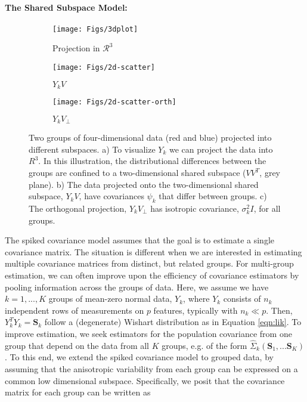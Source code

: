 \documentclass{article}
\newcommand{\bl}[1]{{\mathbf #1}}
\begin{document}
\paragraph{The Shared Subspace Model:}

\begin{figure}[t]
    \centering
    \begin{subfigure}[b]{0.25\textwidth}
        \texttt{[image: Figs/3dplot]}
        \caption{Projection in $\mathcal{R}^3$}
        \label{fig:dmelanRatio}
    \end{subfigure}
\quad
    \begin{subfigure}[b]{0.25\textwidth}
        \texttt{[image: Figs/2d-scatter]}
        \caption{$Y_kV$}
        \label{fig:dmelanPosterior}
    \end{subfigure}
\quad 
    \begin{subfigure}[b]{0.25\textwidth}
        \texttt{[image: Figs/2d-scatter-orth]}
        \caption{$Y_kV_{\perp}$}
        \label{fig:dmelanPosterior}
    \end{subfigure}
    \caption{ Two groups of four-dimensional data (red and blue)
      projected into different subspaces.  a) To visualize $Y_k$ we
      can project the data into $R^3$.  In this illustration, the
      distributional differences between the groups are confined to a
      two-dimensional shared subspace ($VV^T$, grey plane).  b) The
      data projected onto the two-dimensional shared subspace,
      $Y_kV$, have covariances $\psi_k$ that differ between
      groups. c) The orthogonal projection, $Y_kV_{\perp}$
      has isotropic covariance, $\sigma_k^2I$, for all groups.  }
\label{fig:shared}
\end{figure}

The spiked covariance model assumes that the goal is to estimate a
single covariance matrix.  The situation is different when we are
interested in estimating multiple covariance matrices from distinct,
but related groups.  For multi-group estimation, we can often improve
upon the efficiency of covariance estimators by pooling information
across the groups of data.  Here, we assume we have $k=1, ..., K$
groups of mean-zero normal data, $Y_k$, where $Y_k$ consists of $n_k$
independent rows of measurements on $p$ features, typically with
$n_k \ll p$.  Then, $Y_k^TY_k = \bl S_k$ follow a (degenerate) Wishart
distribution as in Equation \ref{eqn:lik}.  To improve estimation, we
seek estimators for the population covariance from one group that depend on the
data from all $K$ groups, e.g. of the form
$\hat \Sigma_k(\bl S_1, ... \bl S_K)$.  To this end, we extend the
spiked covariance model to grouped data, by assuming that the
anisotropic variability from each group can be expressed on a common
low dimensional subspace.  Specifically, we posit that the covariance
matrix for each group can be written as
\end{document}
